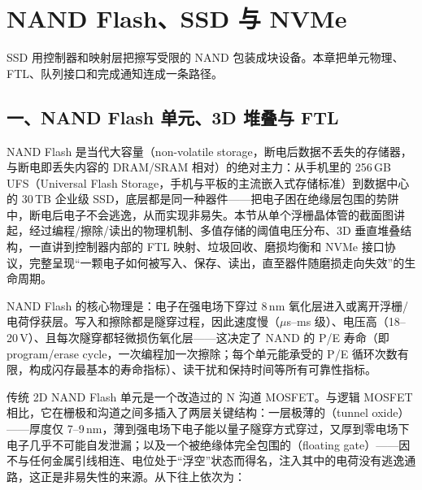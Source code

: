 \chapter{NAND Flash、SSD 与 NVMe}

\begin{keyidea}
SSD 用控制器和映射层把擦写受限的 NAND 包装成块设备。本章把单元物理、FTL、队列接口和完成通知连成一条路径。
\end{keyidea}

\section{一、NAND Flash 单元、3D 堆叠与 FTL}

NAND Flash 是当代大容量（non-volatile storage，断电后数据不丢失的存储器，与断电即丢失内容的 DRAM/SRAM 相对）的绝对主力：从手机里的 256\,GB UFS（Universal Flash Storage，手机与平板的主流嵌入式存储标准）到数据中心的 30\,TB 企业级 SSD，底层都是同一种器件——把电子困在绝缘层包围的势阱中，断电后电子不会逃逸，从而实现非易失。本节从单个浮栅晶体管的截面图讲起，经过编程/擦除/读出的物理机制、多值存储的阈值电压分布、3D 垂直堆叠结构，一直讲到控制器内部的 FTL 映射、垃圾回收、磨损均衡和 NVMe 接口协议，完整呈现“一颗电子如何被写入、保存、读出，直至器件随磨损走向失效”的生命周期。

\begin{keyidea}
NAND Flash 的核心物理是：电子在强电场下穿过 8\,nm 氧化层进入或离开浮栅/电荷俘获层。写入和擦除都是隧穿过程，因此速度慢（$\mu$s--ms 级）、电压高（18--20\,V）、且每次隧穿都轻微损伤氧化层——这决定了 NAND 的 P/E 寿命（即 program/erase cycle，一次编程加一次擦除；每个单元能承受的 P/E 循环次数有限，构成闪存最基本的寿命指标）、读干扰和保持时间等所有可靠性指标。
\end{keyidea}


传统 2D NAND Flash 单元是一个改造过的 N 沟道 MOSFET。与逻辑 MOSFET 相比，它在栅极和沟道之间多插入了两层关键结构：一层极薄的（tunnel oxide）——厚度仅 7--9\,nm，薄到强电场下电子能以量子隧穿方式穿过，又厚到零电场下电子几乎不可能自发泄漏；以及一个被绝缘体完全包围的（floating gate）——因不与任何金属引线相连、电位处于“浮空”状态而得名，注入其中的电荷没有逃逸通路，这正是非易失性的来源。从下往上依次为：


